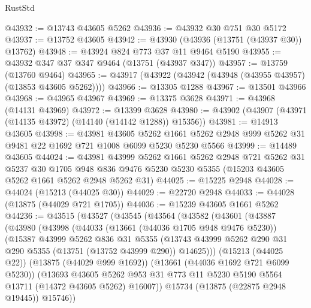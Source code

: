 \begin{lexlean}{RustStd}
\begin{coremodule}
@43932 := @13743 @43605 @5262
@43936 := @43932 @30 @751 @30 @5172
@43937 := @13752 @43605
@43942 := @43930 (@43936 (@13751 (@43937 @30)) @13762)
@43948 := @43924 @824 @773 @37 @11 @9464 @5190
@43955 := @43932 @347 @37 @347 @9464 (@13751 (@43937 @347))
@43957 := @13759 (@13760 @9464)
@43965 := @43917 (@43922 (@43942 (@43948 (@43955 @43957) (@13853 @43605 @5262))))
@43966 := @13305 @1288
@43967 := @13501 @43966
@43968 := @43965 @43967
@43969 := @13375 @3628
@43971 := @43968 (@14131 @43969)
@43972 := @13399 @3628
@43980 := @43902 (@43907 (@43971 (@14135 @43972) (@14140 (@14142 @1288)) @15356))
@43981 := @14913 @43605
@43998 := @43981
    @43605
    @5262
    @1661
    @5262
    @2948
    @999
    @5262
    @31
    @9481
    @22
    @1692
    @721
    @1008
    @6099
    @5230
    @5230
    @5566
@43999 := @14489 @43605
@44024 := @43981
    @43999
    @5262
    @1661
    @5262
    @2948
    @721
    @5262
    @31
    @5237
    @30
    @1705
    @948
    @836
    @9476
    @5230
    @5230
    @5355
    (@15203 @43605 @5262 @1661 @5262 @2948 @5262 @31)
@44025 := @15225 @2948
@44028 := @44024 (@15213 (@44025 @30))
@44029 := @22720 @2948
@44033 := @44028 (@13875 (@44029 @721 @1705))
@44036 := @15239 @43605 @1661 @5262
@44236 := @43515
    (@43527
      (@43545
        (@43564
          (@43582
            (@43601
              (@43887
                (@43980
                  (@43998
                    (@44033
                      (@13661 (@44036 @1705 @948 @9476 @5230))
                      (@15387
                        @43999
                        @5262
                        @836
                        @31
                        @5355
                        (@13743
                          @43999
                          @5262
                          @290
                          @31
                          @290
                          @5355
                          (@13751 (@13752 @43999 @290))
                          @14625)))
                    (@15213 (@44025 @22))
                    (@13875 (@44029 @999 @1692))
                    (@13661 (@44036 @1692 @721 @6099 @5230))
                    (@13693
                      @43605
                      @5262
                      @953
                      @31
                      @773
                      @11
                      @5230
                      @5190
                      @5564
                      @13711
                      (@14372 @43605 @5262)
                      @16007))
                  @15734
                  (@13875 (@22875 @2948 @19445))
                  @15746))

\end{coremodule}
\end{lexlean}
